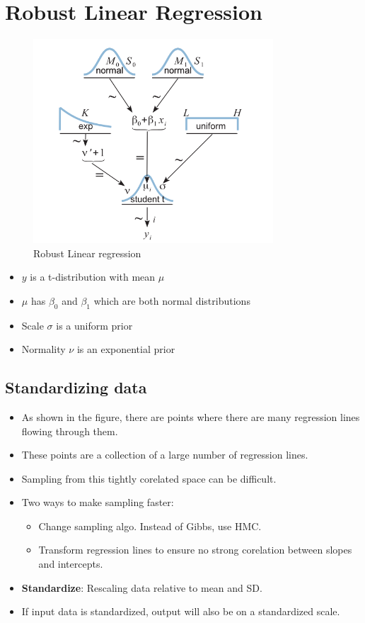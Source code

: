 \documentclass[a4paper]{article}
\begin{document}
\section{Robust Linear Regression}
\begin{figure}[H]
    \centering
    \includegraphics[width=0.8\textwidth]{robust_regression}
    \caption{Robust Linear regression}
    \label{fig:robust_regression}
\end{figure}
\begin{itemize}
    \item $y$ is a t-distribution with mean $\mu$
    \item $\mu$ has $\beta_0$ and $\beta_1$ which are both normal distributions
    \item Scale $\sigma$ is a uniform prior
    \item Normality $\nu$ is an exponential prior
\end{itemize}
\subsection{Standardizing data}
\begin{itemize}
    \item As shown in the figure, there are points where there are many regression lines flowing through them.
    \item These points are a collection of a large number of regression lines.
    \item Sampling from this tightly corelated space can be difficult.
    \item Two ways to make sampling faster:
        \begin{itemize}
            \item Change sampling algo. Instead of Gibbs, use HMC.
            \item Transform regression lines to ensure no strong corelation between slopes and intercepts.
        \end{itemize}
    \item \textbf{Standardize}: Rescaling data relative to mean and SD.  
    \item If input data is standardized, output will also be on a standardized scale. 
\end{itemize}
\end{document}
